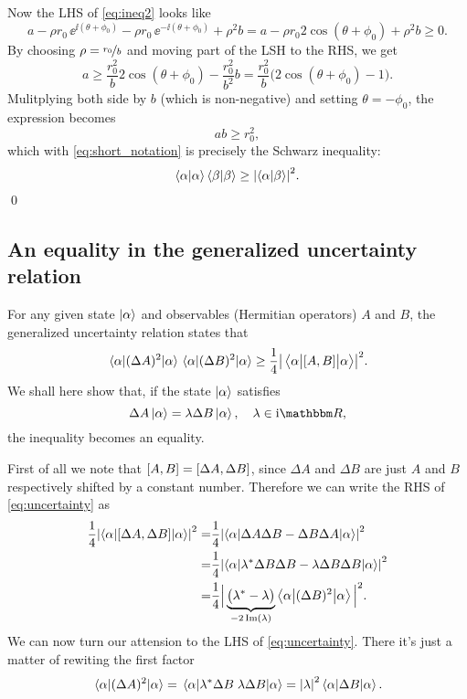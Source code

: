 \documentclass[11pt,letter, swedish, english
]{article}
\begin{document}
Now the LHS of \eqref{eq:ineq2} looks like
\begin{equation}
a -\rho r_0\,\ee^{\ii(\theta + \phi_0)} 
-\rho r_0\,\ee^{-\ii(\theta+\phi_0)} + \rho^2b 
= a - \rho r_0 2\cos(\theta+\phi_0) + \rho^2b \ge 0.
\end{equation}
By choosing $\rho=\nicefrac{r_0}{b}$ and moving part of the LSH to
the RHS, we get
\begin{equation}
a \ge  \frac{r_0^2}{b} 2\cos(\theta+\phi_0) - \frac{r_0^2}{b^2}b 
= \frac{r_0^2}{b} \Big( 2\cos(\theta+\phi_0) - 1 \Big).
\end{equation}
Mulitplying both side by $b$ (which is non-negative) and setting
$\theta=-\phi_0$, the expression becomes
\begin{equation}
ab \ge r_0^2,
\end{equation}
which with \eqref{eq:short_notation} is precisely the Schwarz
inequality:
\begin{equation}
\braket{\alpha}\braket{\beta} \ge \abs{\braket{\alpha}{\beta}}^2.
\end{equation}
\qed

\subsection{An equality in the generalized uncertainty relation}
For any given state $\ket{\alpha}$ and observables (Hermitian
operators) $A$ and $B$, the generalized uncertainty relation states that
\begin{equation} \label{eq:uncertainty}
\ev{(\Delta{A})^2}{\alpha}\ev{(\Delta{B})^2}{\alpha} 
\ge \frac{1}{4} \abs{\ev{\comm{A}{B}}{\big.\alpha}}^2.
\end{equation}
We shall here show that, if the state $\ket{\alpha}$ satisfies
\begin{equation}
\Delta{A}\ket{\alpha}=\lambda \Delta{B}\ket{\alpha}\qcomma \lambda \in \ii\R,
\end{equation}
the inequality becomes an equality.

First of all we note that $\comm{A}{B}=\comm{\Delta{A}}{\Delta{B}}$,
since $\Delta{A}$ and $\Delta{B}$ are just $A$ and $B$ respectively
shifted by a constant number. Therefore we can write the RHS of
\eqref{eq:uncertainty} as
\begin{equation}
\begin{aligned}
\frac{1}{4} \abs{\ev**{\comm{\Delta{A}}{\Delta{B}}}{\alpha}}^2 
=& \frac{1}{4} 
  \abs{\ev**{\Delta{A}\Delta{B} -\Delta{B}\Delta{A}}{\alpha}}^2 \\
=& \frac{1}{4} \abs{
    \ev**{\lambda^*\Delta{B}\Delta{B} - \lambda\Delta{B}\Delta{B}}{\alpha}
   }^2\\
=& \frac{1}{4} \Big| \underbrace{\big(\lambda^*-\lambda\big)}_{-2\Im(\lambda)}
\ev**{(\Delta{B})^2}{\alpha} \Big|^2.
\end{aligned}
\end{equation}
We can now turn our attension to the LHS of
\eqref{eq:uncertainty}. There it's just a matter of rewiting the first
factor
\begin{equation}
\ev{(\Delta{A})^2}{\alpha} 
= \ev{\lambda^*\Delta{B}\;\lambda\Delta{B}}{\alpha} 
= \abs{\lambda}^2 \ev{\Delta{B}}{\alpha}.
\end{equation}
\end{document}
